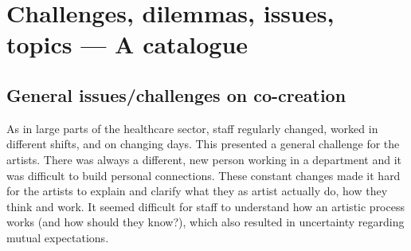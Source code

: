 \documentclass[authordate, empirical]{jote-new-article}
\begin{document}
	\section{Challenges, dilemmas, issues, topics --- A catalogue}
	
	
	

	\subsection{General issues/challenges on co-creation}



	As in large parts of the healthcare sector, staff regularly changed, worked in different shifts, and on changing days. This presented a general challenge for the artists. There was always a different, new person working in a department and it was difficult to build personal connections. These constant changes made it hard for the artists to explain and clarify what they as artist actually do, how they think and work. It seemed difficult for staff to understand how an artistic process works (and how should they know?), which also resulted in uncertainty regarding mutual expectations.
\end{document}
